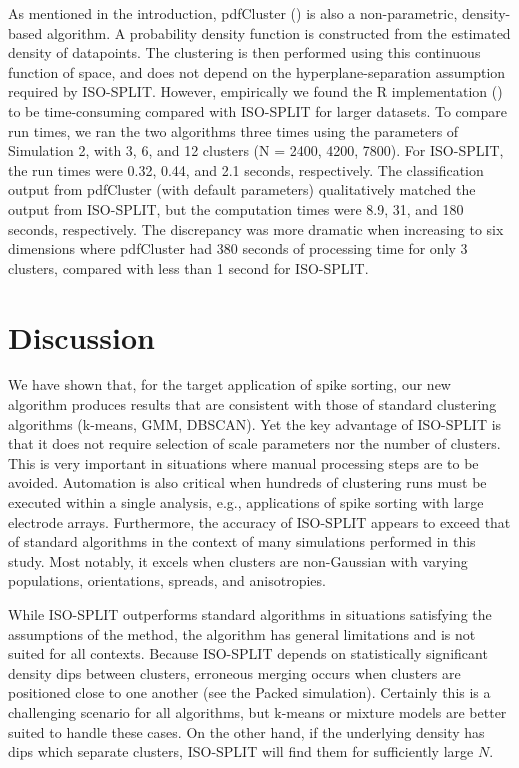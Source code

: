 \documentclass[10pt]{article}
\begin{document}
As mentioned in the introduction, pdfCluster (\cite{pdfcluster}) is also a non-parametric, density-based algorithm. A probability density function is constructed from the estimated density of datapoints. The clustering is then performed using this continuous function of space, and does not depend on the hyperplane-separation assumption required by ISO-SPLIT. However, empirically we found the R implementation (\cite{pdfclusterR}) to be time-consuming compared with ISO-SPLIT for larger datasets. To compare run times, we ran the two algorithms three times using the parameters of Simulation 2, with 3, 6, and 12 clusters (N = 2400, 4200, 7800). For ISO-SPLIT, the run times were 0.32, 0.44, and 2.1 seconds, respectively. The classification output from pdfCluster (with default parameters) qualitatively matched the output from ISO-SPLIT, but the computation times were 8.9, 31, and 180 seconds, respectively. The discrepancy was more dramatic when increasing to six dimensions where pdfCluster had 380 seconds of processing time for only 3 clusters, compared with less than 1 second for ISO-SPLIT.

\section {Discussion}

We have shown that, for the target application of spike sorting, our new algorithm produces results that are consistent with those of standard clustering algorithms (k-means, GMM, DBSCAN). Yet the key advantage of ISO-SPLIT is that it does not require selection of scale parameters nor the number of clusters. This is very important in situations where manual processing steps are to be avoided.
Automation is also critical when hundreds of clustering runs must be executed within a single analysis, e.g., applications of spike sorting with large electrode arrays. Furthermore, the accuracy of ISO-SPLIT appears to exceed that of standard algorithms in the context of many simulations performed in this study. Most notably, it excels when clusters are non-Gaussian with varying populations, orientations, spreads, and anisotropies.

While ISO-SPLIT outperforms standard algorithms in situations satisfying the assumptions of the method, the algorithm has general limitations and is not suited for all contexts. Because ISO-SPLIT depends on statistically significant density dips between clusters, erroneous merging occurs when clusters are positioned close to one another (see the Packed simulation). Certainly this is a challenging scenario for all algorithms, but k-means or mixture models are better suited to handle these cases. On the other hand,
if the underlying density has dips which separate clusters, ISO-SPLIT will
find them for sufficiently large $N$.
\end{document}
